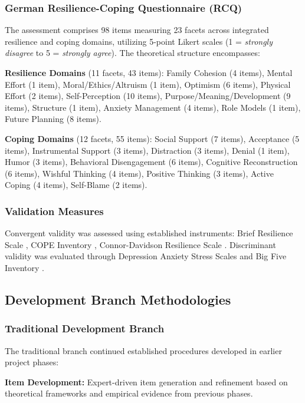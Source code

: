 \documentclass[12pt,a4paper]{article}
\begin{document}
\subsubsection{German Resilience-Coping Questionnaire (RCQ)}

The assessment comprises 98 items measuring 23 facets across integrated resilience and coping domains, utilizing 5-point Likert scales (1 = \textit{strongly disagree} to 5 = \textit{strongly agree}). The theoretical structure encompasses:

\textbf{Resilience Domains} (11 facets, 43 items): Family Cohesion (4 items), Mental Effort (1 item), Moral/Ethics/Altruism (1 item), Optimism (6 items), Physical Effort (2 items), Self-Perception (10 items), Purpose/Meaning/Development (9 items), Structure (1 item), Anxiety Management (4 items), Role Models (1 item), Future Planning (8 items).

\textbf{Coping Domains} (12 facets, 55 items): Social Support (7 items), Acceptance (5 items), Instrumental Support (3 items), Distraction (3 items), Denial (1 item), Humor (3 items), Behavioral Disengagement (6 items), Cognitive Reconstruction (6 items), Wishful Thinking (4 items), Positive Thinking (3 items), Active Coping (4 items), Self-Blame (2 items).

\subsubsection{Validation Measures}

Convergent validity was assessed using established instruments: Brief Resilience Scale \cite{Smith2008}, COPE Inventory \cite{Carver1997}, Connor-Davidson Resilience Scale \cite{Connor2003}. Discriminant validity was evaluated through Depression Anxiety Stress Scales \cite{Lovibond1995} and Big Five Inventory \cite{John2008}.

\subsection{Development Branch Methodologies}

\subsubsection{Traditional Development Branch}

The traditional branch continued established procedures developed in earlier project phases:

\textbf{Item Development:} Expert-driven item generation and refinement based on theoretical frameworks and empirical evidence from previous phases.
\end{document}

